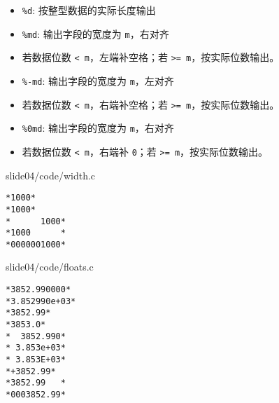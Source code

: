 \begin{frame}[fragile]
\begin{itemize}
\item \lstinline|%d|:  按整型数据的实际长度输出\\[0.1in]
\item \lstinline|%md|:  输出字段的宽度为 \lstinline|m|，右对齐\\ 
\item[] 若数据位数 \lstinline|< m|，左端补空格；若 \lstinline|>= m|，按实际位数输出。\\[0.1in]
\item \lstinline|%-md|: 输出字段的宽度为 \lstinline|m|，左对齐\\ 
\item[] 若数据位数 \lstinline|< m|，右端补空格；若 \lstinline|>= m|，按实际位数输出。\\[0.1in]
\item \lstinline|%0md|: 输出字段的宽度为 \lstinline|m|，右对齐 \\ 
\item[] 若数据位数 \lstinline|< m|，右端补 \lstinline|0|；若 \lstinline|>= m|，按实际位数输出。
\end{itemize}
\end{frame}

\begin{frame}[fragile]
  
  {slide04/code/width.c} \pause 

\begin{lstlisting}[showspaces=true,basicstyle=\ttfamily\small]
*1000*
*1000*
*      1000*
*1000      *
*0000001000*
\end{lstlisting}
\end{frame}


\begin{frame}[fragile]

{slide04/code/floats.c}
\end{frame}

\begin{frame}[fragile]
\begin{lstlisting}[showspaces=true,backgroundcolor=\color{red!20}]
*3852.990000*
*3.852990e+03*
*3852.99*
*3853.0*
*  3852.990*
* 3.853e+03*
* 3.853E+03*
*+3852.99*
*3852.99   *
*0003852.99*
\end{lstlisting}
\end{frame}

